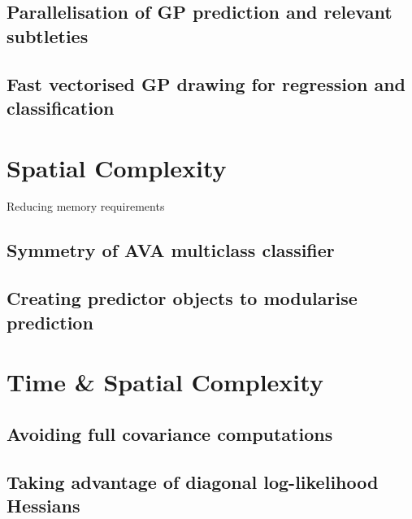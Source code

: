 		\subsection{Parallelisation of GP prediction and relevant subtleties}
		
		\subsection{Fast vectorised GP drawing for regression and classification}
		
	\section{Spatial Complexity}
	
		 Reducing memory requirements
		 
		\subsection{Symmetry of AVA multiclass classifier}
		
		\subsection{Creating predictor objects to modularise prediction}
		
	\section{Time \& Spatial Complexity}
	
		\subsection{Avoiding full covariance computations}
		
		\subsection{Taking advantage of diagonal log-likelihood Hessians}
		
